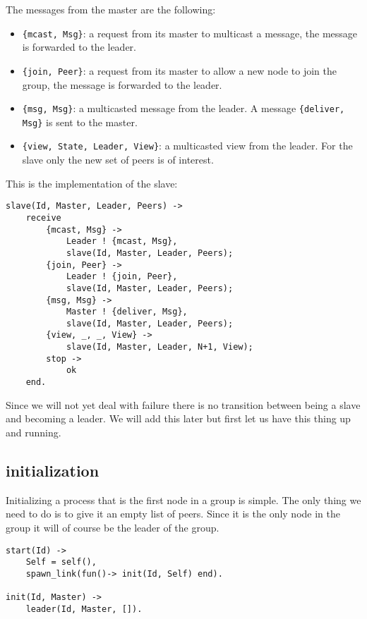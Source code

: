 \documentclass[a4paper,11pt]{article}
\begin{document}
The messages from the master are the following:

\begin{itemize}
\item {\tt \{mcast, Msg\}}: a request from its master to multicast a
  message, the message is forwarded to the leader.
\item {\tt \{join, Peer\}}: a request from its master to allow a new
  node to join the group, the message is forwarded to the leader.
\item {\tt \{msg, Msg\}}: a multicasted message from the leader. A
  message {\tt \{deliver, Msg\}} is sent to the master.
\item {\tt \{view, State, Leader, View\}}: a multicasted view from the
  leader. For the slave only the new set of peers is of interest.
\end{itemize}

This is the implementation of the slave:


\begin{verbatim}
slave(Id, Master, Leader, Peers) ->    
    receive
        {mcast, Msg} ->
            Leader ! {mcast, Msg},
            slave(Id, Master, Leader, Peers);
        {join, Peer} ->
            Leader ! {join, Peer},
            slave(Id, Master, Leader, Peers);
        {msg, Msg} ->
            Master ! {deliver, Msg},
            slave(Id, Master, Leader, Peers);
        {view, _, _, View} ->
            slave(Id, Master, Leader, N+1, View);           
        stop ->
            ok
    end.
\end{verbatim}

Since we will not yet deal with failure there is no transition between
being a slave and becoming a leader. We will add this later but first
let us have this thing up and running.


\subsection{initialization}

Initializing a process that is the first node in a group is
simple. The only thing we need to do is to give it an empty list of
peers. Since it is the only node in the group it will of course be the
leader of the group.

\begin{verbatim}
start(Id) ->
    Self = self(),
    spawn_link(fun()-> init(Id, Self) end).

init(Id, Master) ->
    leader(Id, Master, []).
\end{verbatim}
\end{document}
